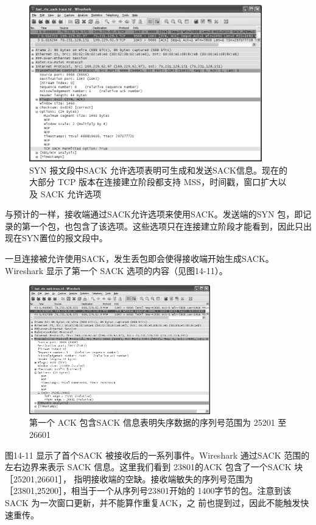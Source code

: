 \begin{figure}[!htb]
\centering
\includegraphics[width=0.9\textwidth]{imgs/14/14-10.png}
\caption{SYN 报文段中SACK 允许选项表明可生成和发送SACK信息。现在的大部分 TCP 版本在连接建立阶段都支持
MSS，时间戳，窗口扩大以及 SACK 允许选项}
\end{figure}

与预计的一样，接收端通过SACK允许选项来使用SACK。发送端的SYN
包，即记录的第一个包，也包含了该选项。这些选项只在连接建立阶段才能看到，因此只出现在SYN置位的报文段中。

一旦连接被允许使用SACK，发生丢包即会使得接收端开始生成SACK。Wireshark 显示了第一个 SACK 选项的内容（见图14-11）。

\begin{figure}[!htb]
\centering
\includegraphics[width=0.7\textwidth]{imgs/14/14-11.png}
\caption{第一个 ACK 包含SACK 信息表明失序数据的序列号范围为 25201 至 26601}
\end{figure}

图14-11 显示了首个SACK 被接收后的一系列事件。Wireshark 通过SACK 范围的左右边界来表示 SACK
信息。这里我们看到 23801的ACK 包含了一个SACK 块［25201,26601］，
指明接收端的空缺。接收端敏失的序列号范围为［23801,25200］，相当于一个从序列号23801开始的 1400字节的包。注意到该
SACK 为一次窗口更新，并不能算作重复ACK，之
前也提到过，因此不能触发快速重传。

